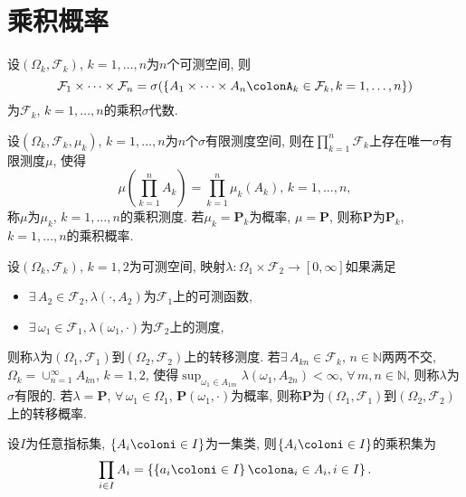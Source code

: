 \chapter{乘积概率}

\def\F{\mathcal{F}}
\def\s{$(\Omega,\F,\mu)$}
\def\R{\mathbb{R}}
\def\P{\mathbf{P}}
\begin{definition}
    设$(\Omega_k,\F_k)$, $k=1,\dots,n$为$n$个可测空间, 则
    \begin{equation}
        \F_1\times\dots\times\F_n=\sigma(\left\{A_1\times\dots\times A_n\colonA_k\in\F_k,k=1,\dots,n\right\})
    \end{equation}
    为$\F_k$, $k=1,\dots,n$的乘积$\sigma$代数.
\end{definition}

\begin{definition}
    设$(\Omega_k,\F_k,\mu_k)$, $k=1,\dots,n$为$n$个$\sigma$有限测度空间, 则在$\prod_{k=1}^{n}\F_k$上存在唯一$\sigma$有限测度$\mu$, 使得
    \begin{equation}
        \mu(\prod_{k=1}^{n}A_k)=\prod_{k=1}^{n}\mu_k(A_k),\,k=1,\dots,n,
    \end{equation}
    称$\mu$为$\mu_k$, $k=1,\dots,n$的乘积测度. 若$\mu_k=\P_k$为概率, $\mu=\P$, 则称$\P$为$\P_k$, $k=1,\dots,n$的乘积概率.
\end{definition}

\begin{definition}
    设$(\Omega_k,\F_k)$, $k=1,2$为可测空间, 映射$\lambda\colon\Omega_1\times\F_2\to[0,\infty]$如果满足
    \begin{itemize}
        \item $\exists\, A_2\in\F_2, \lambda(\cdot,A_2)$为$\F_1$上的可测函数,
        \item $\exists\, \omega_1\in\F_1, \lambda(\omega_1,\cdot)$为$\F_2$上的测度,
    \end{itemize}
    则称$\lambda$为$(\Omega_1,\F_1)$到$(\Omega_2,\F_2)$上的转移测度. 若$\exists\, A_{kn}\in\F_k$, $n\in\mathbb{N}$两两不交, $\Omega_k=\cup_{n=1}^{\infty}A_{kn}$, $k=1,2$, 使得$\sup_{\omega_1\in A_{1m}}\lambda(\omega_1,A_{2n})<\infty$, $\forall\, m,n\in\mathbb{N}$, 则称$\lambda$为$\sigma$有限的. 若$\lambda=\P$, $\forall\, \omega_1\in\Omega_1$, $\P(\omega_1,\cdot)$为概率, 则称$\P$为$(\Omega_1,\F_1)$到$(\Omega_2,\F_2)$上的转移概率.
\end{definition}

\begin{definition}
    设$I$为任意指标集, $\{A_i\coloni\in I\}$为一集类, 则$\{A_i\coloni\in I\}$的乘积集为
    \begin{equation}
        \prod_{i\in I}A_i=\left\{\left\{a_{i}\coloni\in I\right\}\colona_{i}\in A_i,i\in I\right\}.
    \end{equation}
\end{definition}

